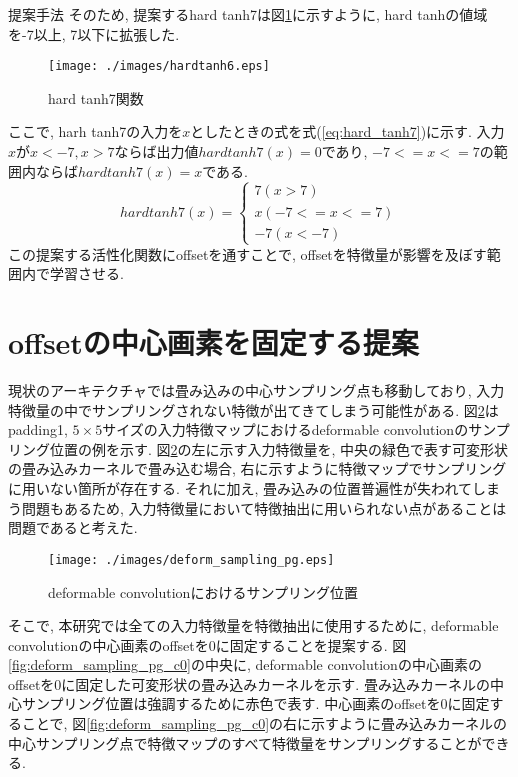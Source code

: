 \begin{chapter}{提案手法}
そのため, 提案するhard tanh7は図\ref{fig:hardtanh6}に示すように, hard tanhの値域を-7以上, 7以下に拡張した. 
\begin{figure}[H]
  \centering
  \texttt{[image: ./images/hardtanh6.eps]}
  \caption{hard tanh7関数}
  \label{fig:hardtanh6}
\end{figure}
ここで, harh tanh7の入力を$x$としたときの式を式(\ref{eq:hard_tanh7})に示す. 入力$x$が$x<-7, x>7$ならば出力値$hardtanh7(x) =0$であり, $-7<=x<=7$の範囲内ならば$hardtanh7(x)=x$である. 
\begin{equation}
  hardtanh7(x) = 
      \begin{cases}
        7  (x>7)\\ 
        x  (-7<=x<=7)\\
        -7  (x<-7) \label{eq:hard_tanh6}
      \end{cases}
\end{equation}
この提案する活性化関数にoffsetを通すことで, offsetを特徴量が影響を及ぼす範囲内で学習させる.

\section{offsetの中心画素を固定する提案}\label{sec:teian_ac_fn}
現状のアーキテクチャでは畳み込みの中心サンプリング点も移動しており, 入力特徴量の中でサンプリングされない特徴が出てきてしまう可能性がある. 図\ref{fig:deform_sampling_pg}はpadding1, $5\times5$サイズの入力特徴マップにおけるdeformable convolutionのサンプリング位置の例を示す. 図\ref{fig:deform_sampling_pg}の左に示す入力特徴量を, 中央の緑色で表す可変形状の畳み込みカーネルで畳み込む場合, 右に示すように特徴マップでサンプリングに用いない箇所が存在する. それに加え, 畳み込みの位置普遍性が失われてしまう問題もあるため, 入力特徴量において特徴抽出に用いられない点があることは問題であると考えた.
\begin{figure}[H]
  \centering
  \texttt{[image: ./images/deform\_sampling\_pg.eps]}
  \caption{deformable convolutionにおけるサンプリング位置}
  \label{fig:deform_sampling_pg}
\end{figure}
そこで, 本研究では全ての入力特徴量を特徴抽出に使用するために, deformable convolutionの中心画素のoffsetを0に固定することを提案する. 図\ref{fig:deform_sampling_pg_c0}の中央に, deformable convolutionの中心画素のoffsetを0に固定した可変形状の畳み込みカーネルを示す. 畳み込みカーネルの中心サンプリング位置は強調するために赤色で表す. 中心画素のoffsetを0に固定することで, 図\ref{fig:deform_sampling_pg_c0}の右に示すように畳み込みカーネルの中心サンプリング点で特徴マップのすべて特徴量をサンプリングすることができる.



\end{chapter}
